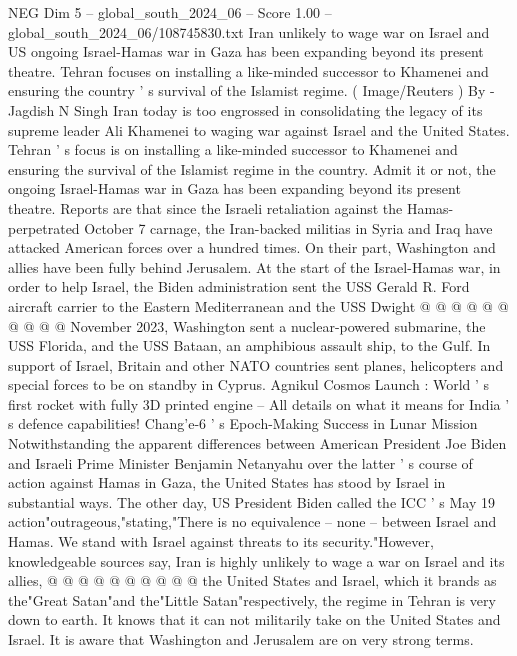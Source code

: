 \begin{textsample}{NEG Dim 5 – global\_south\_2024\_06 – Score 1.00 – global\_south\_2024\_06/108745830.txt}  \label{ex:f5_neg_229}
Iran unlikely to wage war on Israel and US ongoing Israel-Hamas war in Gaza has been expanding beyond its present theatre.
Tehran focuses on installing a like-minded successor to Khamenei and ensuring the country ' s survival of the Islamist regime. ( Image/Reuters ) By -Jagdish N Singh Iran today is too engrossed in consolidating the legacy of its supreme leader Ali Khamenei to waging war against Israel and the United States.
Tehran ' s focus is on installing a like-minded successor to Khamenei and ensuring the survival of the Islamist regime in the country.
Admit it or not, the ongoing Israel-Hamas war in Gaza has been expanding beyond its present theatre.
Reports are that since the Israeli retaliation against the Hamas-perpetrated October 7 carnage, the Iran-backed militias in Syria and Iraq have attacked American forces over a hundred times.
On their part, Washington and allies have been fully behind Jerusalem.
At the start of the Israel-Hamas war, in order to help Israel, the Biden administration sent the USS Gerald R.
Ford aircraft carrier to the Eastern Mediterranean and the USS Dwight @ @ @ @ @ @ @ @ @ @ November 2023, Washington sent a nuclear-powered submarine, the USS Florida, and the USS Bataan, an amphibious assault ship, to the Gulf.
In support of Israel, Britain and other NATO countries sent planes, helicopters and special forces to be on standby in Cyprus.
Agnikul Cosmos Launch : World ' s first rocket with fully 3D printed engine -- All details on what it means for India ' s defence capabilities!
Chang'e-6 ' s Epoch-Making Success in Lunar Mission Notwithstanding the apparent differences between American President Joe Biden and Israeli Prime Minister Benjamin Netanyahu over the latter ' s course of action against Hamas in Gaza, the United States has stood by Israel in substantial ways.
The other day, US President Biden called the ICC ' s May 19 action"outrageous,"stating,"There is no equivalence -- none -- between Israel and Hamas.
We stand with Israel against threats to its security."However, knowledgeable sources say, Iran is highly unlikely to wage a war on Israel and its allies, @ @ @ @ @ @ @ @ @ @ the United States and Israel, which it brands as the"Great Satan"and the"Little Satan"respectively, the regime in Tehran is very down to earth.
It knows that it can not militarily take on the United States and Israel.
It is aware that Washington and Jerusalem are on very strong terms.

\end{textsample}
